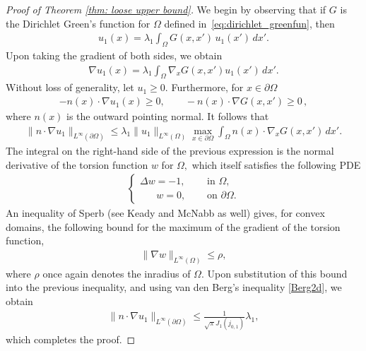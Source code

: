 \documentclass{amsart}
\theoremstyle{plain}
\begin{document}
\begin{proof}[Proof of Theorem \ref{thm: loose upper bound}]
We begin by observing that if $G$ is the Dirichlet Green's function for $\Omega$ defined in~\eqref{eq:dirichlet_greenfun}, then
\begin{align}
   u_1(x) = \lambda_1 \int_\Omega G(x,x') \,u_1(x')\,dx'.
\end{align}
Upon taking the gradient of both sides, we obtain
\begin{align}
    \nabla u_1(x) =\lambda_1 \int_\Omega \nabla_x G(x,x') u_1(x')\,dx'.
\end{align}
Without loss of generality, let $u_1 \ge 0.$
Furthermore, for $x \in \partial \Omega$ 
\begin{align}
    -n(x) \cdot \nabla u_1(x)\geq 0,\quad\quad 
    -n(x) \cdot \nabla G(x,x') \ge 0\,,
\end{align}
where $n(x)$  is the outward pointing normal.
It follows that
\begin{align}
    \|n\cdot \nabla u_1\|_{L^\infty(\partial \Omega)} \le \lambda_1 \|u_1\|_{L^\infty(\Omega)} \max_{x\in \partial \Omega}\int_\Omega n(x)\cdot \nabla_x G(x,x')\,dx'.
\end{align}
The integral on the right-hand side of the previous expression is the normal derivative of the torsion function $w$ for $\Omega,$ which itself satisfies the following PDE
\begin{align}
\begin{cases}
    \Delta w = -1, \quad & \mbox{ in } \Omega,\\
    \quad \,\,\,\, w=0,\quad & \mbox{ on } \partial \Omega.
\end{cases}
\end{align}
An inequality of Sperb (see Keady and McNabb as well) \cite{keady1993elastic,sperb1981maximum}
gives, for convex domains,
the following bound for the maximum of the gradient of the torsion function, 
\begin{align}
\|\nabla w\|_{L^\infty(\Omega)} \le \rho,    
\end{align}
where $\rho$ once again denotes the inradius of $\Omega$.
Upon substitution of this bound into the previous inequality, and using van den Berg's inequality \eqref{Berg2d}, we obtain
\begin{align}
     \|n\cdot \nabla u_1\|_{L^\infty(\partial \Omega)} \le \frac{1}{\sqrt{\pi} J_1(j_{0,1}) } \lambda_1, 
\end{align}
which completes the proof.
\end{proof}
\end{document}
